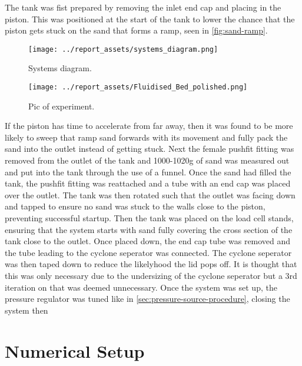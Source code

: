 The tank was fist prepared by removing the inlet end cap and placing in the piston. This was positioned at the start of the tank to lower the chance that the piston gets stuck on the sand that forms a ramp, seen in \autoref{fig:sand-ramp}.
\begin{figure}[htbp]
    \centering
    
    \begin{minipage}{0.45\textwidth}
        \centering
        \texttt{[image: ../report\_assets/systems\_diagram.png]}
        \caption{Systems diagram.}\label{fig:sand-ramp}
    \end{minipage}
    \hfill
    \begin{minipage}{0.45\textwidth}
        \centering
        \texttt{[image: ../report\_assets/Fluidised\_Bed\_polished.png]}
        \caption{Pic of experiment.}\label{fig:wawaweewa}
    \end{minipage}
    
\end{figure}
If the piston has time to accelerate from far away, then it was found to be more likely to sweep that ramp sand forwards with its movement and fully pack the sand into the outlet instead of getting stuck. Next the female pushfit fitting was removed from the outlet of the tank and 1000-1020g of sand was measured out and put into the tank through the use of a funnel. Once the sand had filled the tank, the pushfit fitting was reattached and a tube with an end cap was placed over the outlet. The tank was then rotated such that the outlet was facing down and tapped to ensure no sand was stuck to the walls close to the piston, preventing successful startup. Then the tank was placed on the load cell stands, ensuring that the system starts with sand fully covering the cross section of the tank close to the outlet. Once placed down, the end cap tube was removed and the tube leading to the cyclone seperator was connected. The cyclone seperator was then taped down to reduce the likelyhood the lid pops off. It is thought that this was only necessary due to the undersizing of the cyclone seperator but a 3rd iteration on that was deemed unnecessary. Once the system was set up, the pressure regulator was tuned like in \autoref{sec:pressure-source-procedure}, closing the system then 
\newpage
\section{Numerical Setup}\label{sec:numerical-setup}
